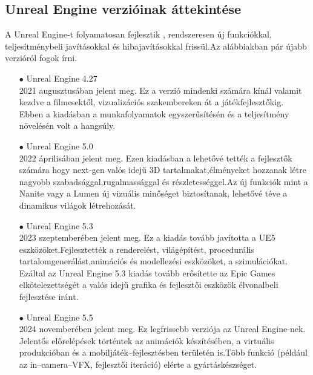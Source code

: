 \documentclass[
]{thesis-ekf}
\theoremstyle{definition}
\theoremstyle{remark}
\begin{document}
\subsection{Unreal Engine verzióinak áttekintése}
A Unreal Engine-t folyamatosan fejlesztik , rendszeresen új funkciókkal, teljesítménybeli javításokkal és hibajavításokkal frissül.Az alábbiakban pár újabb verzióról fogok írni.
\begin{itemize}
	\item[$\bullet$]Unreal Engine 4.27 \\ 2021 augusztusában jelent meg. Ez a verzió mindenki számára kínál valamit kezdve a filmesektől, vizualizációs szakembereken át a játékfejlesztőkig. Ebben a kiadásban a munkafolyamatok egyszerűsítésén és a teljesítmény növelésén volt a hangsúly.
	\item[$\bullet$]Unreal Engine 5.0 \\ 2022 áprilisában jelent meg. Ezen kiadásban a lehetővé tették a fejlesztők számára hogy next-gen valós idejű 3D tartalmakat,élményeket hozzanak létre nagyobb szabadsággal,rugalmassággal és részletességgel.Az új funkciók mint a Nanite vagy a Lumen új vizuális minőséget biztosítanak, lehetővé téve a dinamikus világok létrehozását.
	\item[$\bullet$]Unreal Engine 5.3 \\ 2023 szeptemberében jelent meg. Ez a kiadás tovább javította a UE5 eszközöket.Fejlesztették a renderelést, világépítést, procedurális tartalomgenerálást,animációs és modellezési eszközöket, a szimulációkat. Ezáltal az Unreal Engine 5.3 kiadás tovább erősítette az Epic Games elkötelezettségét a valós idejű grafika és fejlesztői eszközök élvonalbeli fejlesztése iránt.
	\item[$\bullet$]Unreal Engine 5.5 \\ 2024 novemberében jelent meg. Ez legfrissebb verziója az Unreal Engine-nek. Jelentős előrelépések történtek az animációk készítésében, a virtuális produkcióban és a mobiljáték--fejlesztésben területén is.Több funkció (például az in--camera--VFX, fejlesztői iteráció) elérte a gyártáskészséget. 
\end{itemize}
\end{document}
